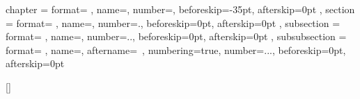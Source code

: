
\ctexset
    {
        chapter =
        {
            format= \heiti,
            name={},
            number=,
            beforeskip=-35pt,
            afterskip=0pt
        },
        section =
        {
            format= \heiti,
            name={},
            number=.,
            beforeskip=0pt,
            afterskip=0pt
        },
        subsection =
        {
            format= \heiti,
            name={},
            number=..,
            beforeskip=0pt,
            afterskip=0pt
        },
        subsubsection =
        {
            format= \heiti ,
            name={},
            aftername=~,
            numbering=true,
            number=...,
            beforeskip=0pt,
            afterskip=0pt
        }
    }


\makeatletter
{}
\makeatother

\renewcommand{\contentsname}{\zihao{3} \heiti \bfseries 目\quad 录}
\newcommand{\markloc}{\addcontentsline{toc}{chapter}{目录}}
\renewcommand{\listfigurename}{\zihao{3} \heiti \bfseries 插\quad 图}
\newcommand{\marklof}{\addcontentsline{toc}{chapter}{插图}}
\renewcommand{\listtablename}{\zihao{3} \heiti \bfseries 表\quad 格}
\newcommand{\marklot}{\addcontentsline{toc}{chapter}{表格}}

\renewcommand{\contentsname}{\zihao{3} \heiti 目\quad 录}

[\bibname]{
}
\captionsetup{labelsep=quad}